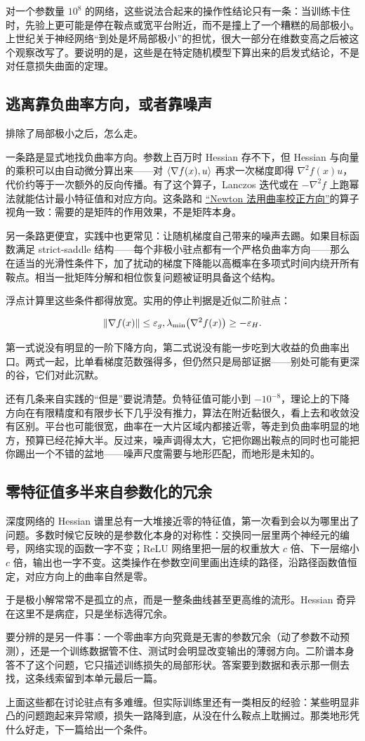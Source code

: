 对一个参数量 \(10^8\) 的网络，这些说法合起来的操作性结论只有一条：当训练卡住时，先验上更可能是停在鞍点或宽平台附近，而不是撞上了一个糟糕的局部极小。上世纪关于神经网络``到处是坏局部极小''的担忧，很大一部分在维数变高之后被这个观察改写了。要说明的是，这些是在特定随机模型下算出来的启发式结论，不是对任意损失曲面的定理。

\subsection{逃离靠负曲率方向，或者靠噪声}

排除了局部极小之后，怎么走。

一条路是显式地找负曲率方向。参数上百万时 Hessian 存不下，但 Hessian 与向量的乘积可以由自动微分算出来——对 \(\left\langle\nabla f(x),u\right\rangle\) 再求一次梯度即得 \(\nabla^2f(x)u\)，代价约等于一次额外的反向传播。有了这个算子，Lanczos 迭代或在 \(-\nabla^2f\) 上跑幂法就能估计最小特征值和对应方向。这条路和 \hyperref[sec:09-Convex-Optimization/06-Optimization-Algorithms/02]{``Newton 法用曲率校正方向''}的算子视角一致：需要的是矩阵的作用效果，不是矩阵本身。

另一条路更便宜，实践中也更常见：让随机梯度自己带来的噪声去踢。如果目标函数满足 strict-saddle 结构——每个非极小驻点都有一个严格负曲率方向——那么在适当的光滑性条件下，加了扰动的梯度下降能以高概率在多项式时间内绕开所有鞍点。相当一批矩阵分解和相位恢复问题被证明具备这个结构。

浮点计算里这些条件都得放宽。实用的停止判据是近似二阶驻点：

\[
\left\lVert\nabla f(x)\right\rVert\le\varepsilon_g,\space \lambda_{\min}\bigl(\nabla^2f(x)\bigr)\ge-\varepsilon_H .
\]

第一式说没有明显的一阶下降方向，第二式说没有能一步吃到大收益的负曲率出口。两式一起，比单看梯度范数强得多，但仍然只是局部证据——别处可能有更深的谷，它们对此沉默。

还有几条来自实践的``但是''要说清楚。负特征值可能小到 \(-10^{-8}\)，理论上的下降方向在有限精度和有限步长下几乎没有推力，算法在附近黏很久，看上去和收敛没有区别。平台也可能很宽，曲率在一大片区域内都接近零，等走到负曲率明显的地方，预算已经花掉大半。反过来，噪声调得太大，它把你踢出鞍点的同时也可能把你踢出一个不错的盆地——噪声尺度需要与地形匹配，而地形是未知的。

\subsection{零特征值多半来自参数化的冗余}

深度网络的 Hessian 谱里总有一大堆接近零的特征值，第一次看到会以为哪里出了问题。多数时候它反映的是参数化本身的对称性：交换同一层里两个神经元的编号，网络实现的函数一字不变；ReLU 网络里把一层的权重放大 \(c\) 倍、下一层缩小 \(c\) 倍，输出也一字不变。这类操作在参数空间里画出连续的路径，沿路径函数值恒定，对应方向上的曲率自然是零。

于是极小解常常不是孤立的点，而是一整条曲线甚至更高维的流形。Hessian 奇异在这里不是病症，只是坐标选得冗余。

要分辨的是另一件事：一个零曲率方向究竟是无害的参数冗余（动了参数不动预测），还是一个训练数据管不住、测试时会明显改变输出的薄弱方向。二阶谱本身答不了这个问题，它只描述训练损失的局部形状。答案要到数据和表示那一侧去找，这条线索留到本单元最后一篇。

上面这些都在讨论驻点有多难缠。但实际训练里还有一类相反的经验：某些明显非凸的问题跑起来异常顺，损失一路降到底，从没在什么鞍点上耽搁过。那类地形凭什么好走，下一篇给出一个条件。
